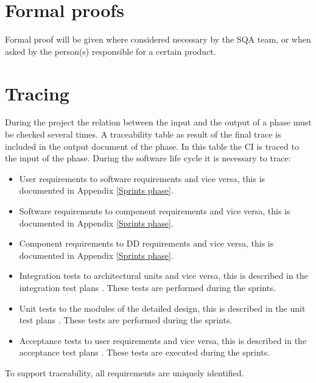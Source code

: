 \section{Formal proofs}
Formal proof will be given where considered necessary by the SQA team, or when asked by the person(s) responsible for a certain product.

\section{Tracing} \label{tracing}
During the project the relation between the input and the output of a phase must be checked several times. A traceability table as result of the final trace is included in the output document of the phase. In this table the CI is traced to the input of the phase. During the software life cycle it is necessary to trace:

\begin{itemize}
\item User requirements to software requirements and vice versa, this is documented in Appendix \ref{Sprints phase}.
\item Software requirements to component requirements and vice versa, this is documented in Appendix \ref{Sprints phase}.
\item Component requirements to DD requirements and vice versa, this is documented in Appendix \ref{Sprints phase}.
\item Integration tests to architectural units and vice versa, this is described in the integration test plans \cite{itp}. These tests are performed during the sprints.
\item Unit tests to the modules of the detailed design, this is described in the unit test plans \cite{utp}. These tests are performed during the sprints.
\item Acceptance tests to user requirements and vice versa, this is described in the acceptance test plans \cite{atp}. These tests are executed during the sprints.
\end{itemize}
To support traceability, all requirements are uniquely identified.
